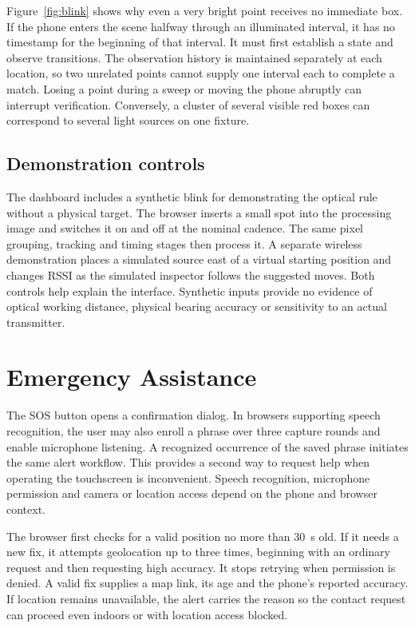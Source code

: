 \documentclass[conference]{IEEEtran}
\begin{document}
Figure~\ref{fig:blink} shows why even a very bright point receives no immediate box. If the phone enters the scene halfway through an illuminated interval, it has no timestamp for the beginning of that interval. It must first establish a state and observe transitions. The observation history is maintained separately at each location, so two unrelated points cannot supply one interval each to complete a match. Losing a point during a sweep or moving the phone abruptly can interrupt verification. Conversely, a cluster of several visible red boxes can correspond to several light sources on one fixture.

\subsection{Demonstration controls}
The dashboard includes a synthetic blink for demonstrating the optical rule without a physical target. The browser inserts a small spot into the processing image and switches it on and off at the nominal cadence. The same pixel grouping, tracking and timing stages then process it. A separate wireless demonstration places a simulated source east of a virtual starting position and changes RSSI as the simulated inspector follows the suggested moves. Both controls help explain the interface. Synthetic inputs provide no evidence of optical working distance, physical bearing accuracy or sensitivity to an actual transmitter.

\section{Emergency Assistance}
The SOS button opens a confirmation dialog. In browsers supporting speech recognition, the user may also enroll a phrase over three capture rounds and enable microphone listening. A recognized occurrence of the saved phrase initiates the same alert workflow. This provides a second way to request help when operating the touchscreen is inconvenient. Speech recognition, microphone permission and camera or location access depend on the phone and browser context.

The browser first checks for a valid position no more than 30~s old. If it needs a new fix, it attempts geolocation up to three times, beginning with an ordinary request and then requesting high accuracy. It stops retrying when permission is denied. A valid fix supplies a map link, its age and the phone's reported accuracy. If location remains unavailable, the alert carries the reason so the contact request can proceed even indoors or with location access blocked.
\end{document}
